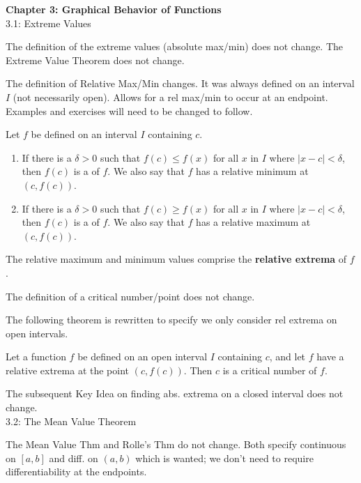 \documentclass{article}
\begin{document}
\noindent\large\textbf{Chapter 3: Graphical Behavior of Functions}\normalsize\\

3.1: Extreme Values

The definition of the extreme values (absolute max/min) does not change. The Extreme Value Theorem does not change.

The definition of Relative Max/Min changes. It was always defined on an interval $I$ (not necessarily open).  Allows for a rel max/min to occur at an endpoint. Examples and exercises will need to be changed to follow.

%
{Let $f$ be defined on an interval $I$ containing $c$. 
		\begin{enumerate}
		\item	If there is a $\delta>0$ such that $f(c) \leq f(x)$ for all $x$ in $I$ where $|x-c|<\delta$, then $f(c)$ is a  of $f$. We also say that $f$ has a relative minimum at $(c,f(c))$. 
		
		\item	If there is a $\delta>0$ such that $f(c) \geq f(x)$ for all $x$ in $I$ where $|x-c|<\delta$, then $f(c)$ is a  of $f$. We also say that $f$ has a relative maximum at $(c,f(c))$. 
		\end{enumerate}
		
The relative maximum and minimum values comprise the \textbf{relative extrema} of $f$.
}

The definition of a critical number/point does not change. 

The following theorem is rewritten to specify we only consider rel extrema on open intervals.

{Let a function $f$ be defined on an open interval $I$ containing $c$, and let $f$ have a relative extrema at the point $(c,f(c))$. Then $c$ is a critical number of $f$.
}

The subsequent Key Idea on finding abs. extrema on a closed interval does not change.\\


3.2: The Mean Value Theorem

The Mean Value Thm and Rolle's Thm do not change. Both specify continuous on $[a,b]$ and diff. on $(a,b)$ which is wanted; we don't need to require differentiability at the endpoints. \\
\end{document}
